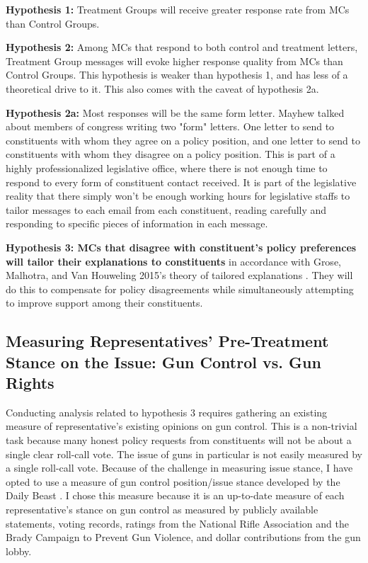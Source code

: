 \documentclass[12pt]{article}
\begin{document}
\textbf{Hypothesis 1: }Treatment Groups will receive greater response rate from MCs than Control Groups.

\textbf{Hypothesis 2: }Among MCs that respond to both control and treatment letters, Treatment Group messages will evoke higher response quality from MCs than Control Groups. This hypothesis is weaker than hypothesis 1, and has less of a theoretical drive to it. This also comes with the caveat of hypothesis 2a. 

\textbf{Hypothesis 2a: } Most responses will be the same form letter. Mayhew talked about members of congress writing two "form" letters. One letter to send to constituents with whom they agree on a policy position, and one letter to send to constituents with whom they disagree on a policy position. This is part of a highly professionalized legislative office, where there is not enough time to respond to every form of constituent contact received. It is part of the legislative reality that there simply won't be enough working hours for legislative staffs to tailor messages to each email from each constituent, reading carefully and responding to specific pieces of information in each message. 

\textbf{Hypothesis 3: MCs that disagree with constituent's policy preferences will tailor their explanations to constituents} in accordance with Grose, Malhotra, and Van Houweling 2015's theory of tailored explanations \citep{Kingdon:1989aa,Grose:2015aa,fenno1978home}. They will do this to compensate for policy disagreements while simultaneously attempting to improve support among their constituents.

\subsection{Measuring Representatives' Pre-Treatment Stance on the Issue: Gun Control vs. Gun Rights}
Conducting analysis related to hypothesis 3 requires gathering an existing measure of representative's existing opinions on gun control. This is a non-trivial task because many honest policy requests from constituents will not be about a single clear roll-call vote. The issue of guns in particular is not easily measured by a single roll-call vote. Because of the challenge in measuring issue stance, I have opted to use a measure of gun control position/issue stance developed by the Daily Beast \cite{Michael-Keller:aa}. I chose this measure because it is an up-to-date measure of each representative's stance on gun control as measured by publicly available statements, voting records, ratings from the National Rifle Association and the Brady Campaign to Prevent Gun Violence, and dollar contributions from the gun lobby.
\end{document}
